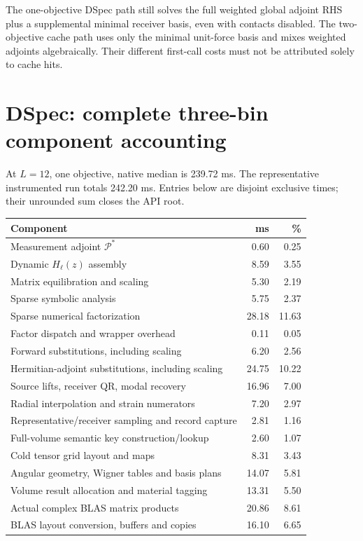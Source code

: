 The one-objective DSpec path still solves the full weighted global adjoint RHS plus a supplemental minimal receiver basis, even with contacts disabled. The two-objective cache path uses only the minimal unit-force basis and mixes weighted adjoints algebraically. Their different first-call costs must not be attributed solely to cache hits.

\clearpage\section{DSpec: complete three-bin component accounting}
At $L=12$, one objective, native median is 239.72 ms. The representative instrumented run totals 242.20 ms. Entries below are disjoint exclusive times; their unrounded sum closes the API root.
\begin{center}\small
\begin{tabular}{p{}rr}\toprule Component & ms & \%\\\midrule
Measurement adjoint $\mathcal P^*$ & 0.60 & 0.25\\
Dynamic $H_\ell(z)$ assembly & 8.59 & 3.55\\
Matrix equilibration and scaling & 5.30 & 2.19\\
Sparse symbolic analysis & 5.75 & 2.37\\
Sparse numerical factorization & 28.18 & 11.63\\
Factor dispatch and wrapper overhead & 0.11 & 0.05\\
Forward substitutions, including scaling & 6.20 & 2.56\\
Hermitian-adjoint substitutions, including scaling & 24.75 & 10.22\\
Source lifts, receiver QR, modal recovery & 16.96 & 7.00\\
Radial interpolation and strain numerators & 7.20 & 2.97\\
Representative/receiver sampling and record capture & 2.81 & 1.16\\
Full-volume semantic key construction/lookup & 2.60 & 1.07\\
Cold tensor grid layout and maps & 8.31 & 3.43\\
Angular geometry, Wigner tables and basis plans & 14.07 & 5.81\\
Volume result allocation and material tagging & 13.31 & 5.50\\
Actual complex BLAS matrix products & 20.86 & 8.61\\
BLAS layout conversion, buffers and copies & 16.10 & 6.65\\

\end{tabular}
\end{center}
